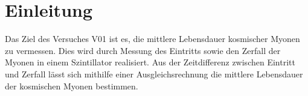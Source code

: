 \section{Einleitung}
\label{sec:einleitung}
Das Ziel des Versuches V01 ist es, die mittlere Lebensdauer kosmischer Myonen zu vermessen.
Dies wird durch Messung des Eintritts sowie den Zerfall der Myonen in einem Szintillator realisiert.
Aus der Zeitdifferenz zwischen Eintritt und Zerfall lässt sich mithilfe einer Ausgleichsrechnung die
mittlere Lebensdauer der kosmischen Myonen bestimmen.
